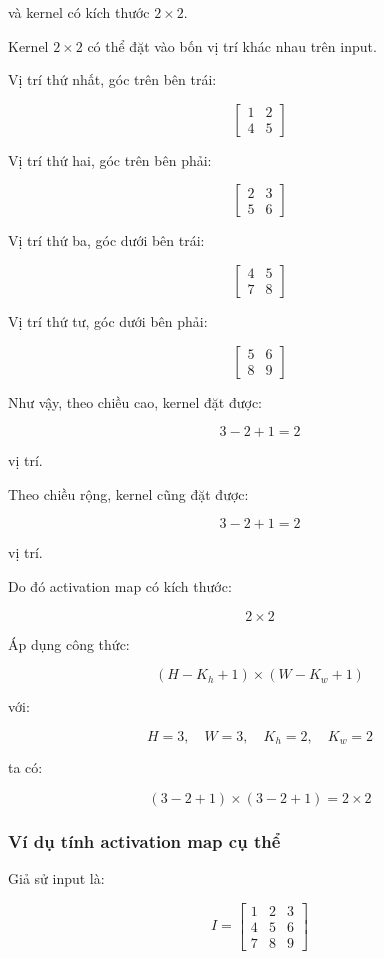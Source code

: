 và kernel có kích thước $2 \times 2$.

Kernel $2 \times 2$ có thể đặt vào bốn vị trí khác nhau trên input.

Vị trí thứ nhất, góc trên bên trái:

\[
\begin{bmatrix}
1 & 2\\
4 & 5
\end{bmatrix}
\]

Vị trí thứ hai, góc trên bên phải:

\[
\begin{bmatrix}
2 & 3\\
5 & 6
\end{bmatrix}
\]

Vị trí thứ ba, góc dưới bên trái:

\[
\begin{bmatrix}
4 & 5\\
7 & 8
\end{bmatrix}
\]

Vị trí thứ tư, góc dưới bên phải:

\[
\begin{bmatrix}
5 & 6\\
8 & 9
\end{bmatrix}
\]

Như vậy, theo chiều cao, kernel đặt được:

\[
    3-2+1=2
\]

vị trí.

Theo chiều rộng, kernel cũng đặt được:

\[
    3-2+1=2
\]

vị trí.

Do đó activation map có kích thước:

\[
    2 \times 2
\]

Áp dụng công thức:

\[
    (H-K_h+1)\times(W-K_w+1)
\]

với:

\[
    H=3,\quad W=3,\quad K_h=2,\quad K_w=2
\]

ta có:

\[
    (3-2+1)\times(3-2+1)=2\times2
\]

\subsubsection{Ví dụ tính activation map cụ thể}

Giả sử input là:

\[
I=
\begin{bmatrix}
1 & 2 & 3\\
4 & 5 & 6\\
7 & 8 & 9
\end{bmatrix}
\]

